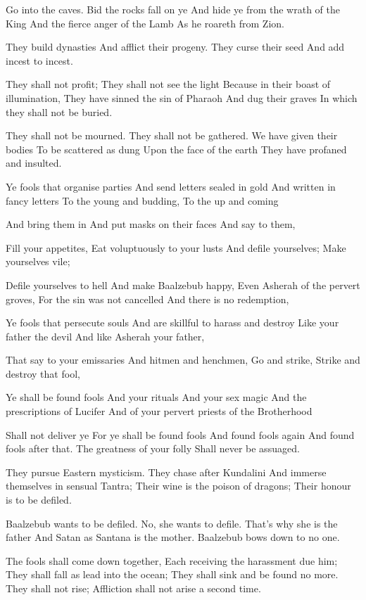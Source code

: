 \documentclass[
]{book}
\begin{document}
Go into the caves.
Bid the rocks fall on ye
And hide ye from the wrath of the King
And the fierce anger of the Lamb
As he roareth from Zion.

They build dynasties
And afflict their progeny.
They curse their seed
And add incest to incest.

They shall not profit;
They shall not see the light
Because in their boast of illumination,
They have sinned the sin of Pharaoh
And dug their graves
In which they shall not be buried.

They shall not be mourned.
They shall not be gathered.
We have given their bodies
To be scattered as dung
Upon the face of the earth
They have profaned and insulted.

Ye fools that organise parties
And send letters sealed in gold
And written in fancy letters
To the young and budding,
To the up and coming

And bring them in
And put masks on their faces
And say to them,

Fill your appetites,
Eat voluptuously to your lusts
And defile yourselves;
Make yourselves vile;

Defile yourselves to hell
And make Baalzebub happy,
Even Asherah of the pervert groves,
For the sin was not cancelled
And there is no redemption,

Ye fools that persecute souls
And are skillful to harass and destroy
Like your father the devil
And like Asherah your father,

That say to your emissaries
And hitmen and henchmen,
Go and strike,
Strike and destroy that fool,

Ye shall be found fools
And your rituals
And your sex magic
And the prescriptions of Lucifer
And of your pervert priests of the Brotherhood

Shall not deliver ye
For ye shall be found fools
And found fools again
And found fools after that.
The greatness of your folly
Shall never be assuaged.

They pursue Eastern mysticism.
They chase after Kundalini
And immerse themselves in sensual Tantra;
Their wine is the poison of dragons;
Their honour is to be defiled.

Baalzebub wants to be defiled.
No, she wants to defile.
That's why she is the father
And Satan as Santana is the mother.
Baalzebub bows down to no one.

The fools shall come down together,
Each receiving the harassment due him;
They shall fall as lead into the ocean;
They shall sink and be found no more.
They shall not rise;
Affliction shall not arise a second time.
\end{document}
